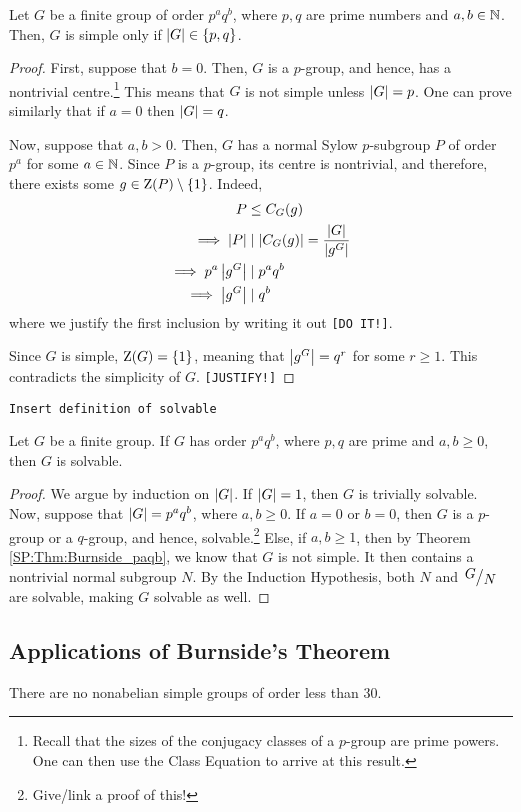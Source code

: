 \begin{boxtheorem} \label{SP:Thm:Burnside_paqb}
    Let $G$ be a finite group of order $p^a q^b$, where $p, q$ are prime numbers and $a, b \in \mathbb{N}$. Then, $G$ is simple only if $\left\lvert G \right\rvert \in \left\{ p, q \right\}$.
\end{boxtheorem}
\begin{proof}
    First, suppose that $b = 0$. Then, $G$ is a $p$-group, and hence, has a nontrivial centre.\footnote{Recall that the sizes of the conjugacy classes of a $p$-group are prime powers. One can then use the Class Equation to arrive at this result.} This means that $G$ is not simple unless $\left\lvert G \right\rvert = p$. One can prove similarly that if $a = 0$ then $\left\lvert G \right\rvert = q$.
    
    Now, suppose that $a, b > 0$. Then, $G$ has a normal Sylow $p$-subgroup $P$ of order $p^a$ for some $a \in \mathbb{N}$. Since $P$ is a $p$-group, its centre is nontrivial, and therefore, there exists some $g \in \operatorname{Z}\!\left( P \right) \setminus \left\{ 1 \right\}$. Indeed,
    \begin{align*}
        P &\leq C_G(g) \\
        \implies \left\lvert P \right\rvert &\mid \left\lvert C_G(g) \right\rvert = \frac{\left\lvert G \right\rvert}{\left\lvert g^G \right\rvert} \\
        \implies p^a \left\lvert g^G \right\rvert &\mid p^a q^b \\
        \implies \left\lvert g^G \right\rvert &\mid q^b
    \end{align*}
    where we justify the first inclusion by writing it out \verb|[DO IT!]|.
    
    Since $G$ is simple, $\operatorname{Z}\!\left( G \right) = \left\{ 1 \right\}$, meaning that $\left\lvert g^G \right\rvert = q^r$ for some $r \geq 1$. This contradicts the simplicity of $G$. \verb|[JUSTIFY!]|
\end{proof}

\verb|Insert definition of solvable|

\begin{boxtheorem}
    Let $G$ be a finite group. If $G$ has order $p^a q^b$, where $p, q$ are prime and $a, b \geq 0$, then $G$ is solvable.
\end{boxtheorem}
\begin{proof}
    We argue by induction on $\left\lvert G \right\rvert$. If $\left\lvert G \right\rvert = 1$, then $G$ is trivially solvable. Now, suppose that $\left\lvert G \right\rvert = p^a q^b$, where $a, b \geq 0$. If $a = 0$ or $b = 0$, then $G$ is a $p$-group or a $q$-group, and hence, solvable.\footnote{Give/link a proof of this!} Else, if $a, b \geq 1$, then by Theorem \ref{SP:Thm:Burnside_paqb}, we know that $G$ is not simple. It then contains a nontrivial normal subgroup $N$. By the Induction Hypothesis, both $N$ and $\quotient{G}{N}$ are solvable, making $G$ solvable as well.
\end{proof}

\subsection{Applications of Burnside's Theorem}

\begin{lemma}
    There are no nonabelian simple groups of order less than $30$.
\end{lemma}